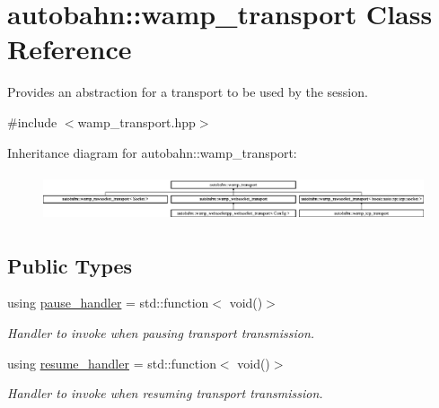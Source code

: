 \hypertarget{classautobahn_1_1wamp__transport}{}\section{autobahn\+:\+:wamp\+\_\+transport Class Reference}
\label{classautobahn_1_1wamp__transport}


Provides an abstraction for a transport to be used by the session.  




{\ttfamily \#include $<$wamp\+\_\+transport.\+hpp$>$}

Inheritance diagram for autobahn\+:\+:wamp\+\_\+transport\+:\begin{figure}[H]
\begin{center}
\leavevmode
\includegraphics[height=1.417722cm]{classautobahn_1_1wamp__transport}
\end{center}
\end{figure}
\subsection*{Public Types}
\begin{DoxyCompactItemize}
\item 
using \hyperlink{classautobahn_1_1wamp__transport_a834b28db4d03bdb3ff77a4638cc2867d}{pause\+\_\+handler} = std\+::function$<$ void()$>$\hypertarget{classautobahn_1_1wamp__transport_a834b28db4d03bdb3ff77a4638cc2867d}{}\label{classautobahn_1_1wamp__transport_a834b28db4d03bdb3ff77a4638cc2867d}

\begin{DoxyCompactList}\small\item\em Handler to invoke when pausing transport transmission. \end{DoxyCompactList}\item 
using \hyperlink{classautobahn_1_1wamp__transport_ad36057ec27420793db7d8d658f3f003c}{resume\+\_\+handler} = std\+::function$<$ void()$>$\hypertarget{classautobahn_1_1wamp__transport_ad36057ec27420793db7d8d658f3f003c}{}\label{classautobahn_1_1wamp__transport_ad36057ec27420793db7d8d658f3f003c}

\begin{DoxyCompactList}\small\item\em Handler to invoke when resuming transport transmission. \end{DoxyCompactList}\end{DoxyCompactItemize}
